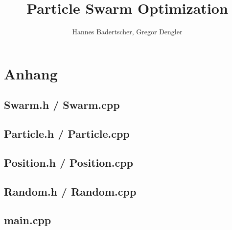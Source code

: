 \documentclass{article}
\title{Particle Swarm Optimization}
\author{Hannes Badertscher, Gregor Dengler}
\numberwithin{equation}{section}
\numberwithin{figure}{section}
\begin{document}
	
	
	
	
	
	
	
	
	
	
	\newpage
	
	
	
	\section{Anhang}
	\subsection{Swarm.h / Swarm.cpp}
	
	
	\subsection{Particle.h / Particle.cpp}
	
	
	\subsection{Position.h / Position.cpp}
	
	
	\subsection{Random.h / Random.cpp}
	
	
	\subsection{main.cpp}
	
	
\end{document}
